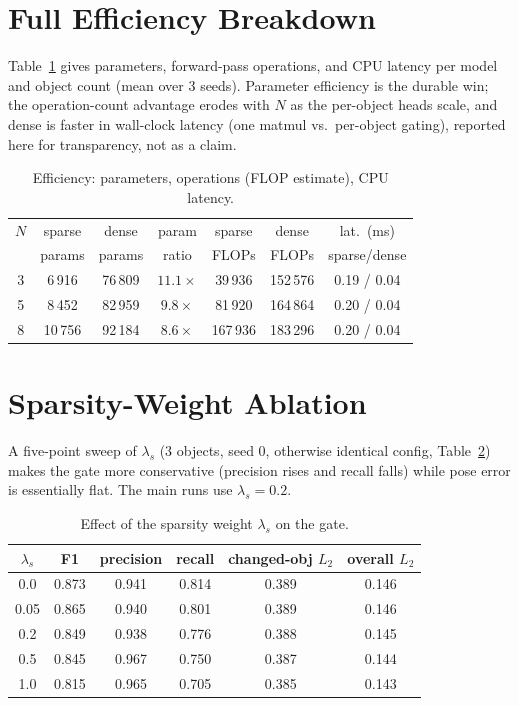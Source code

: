 \documentclass[conference]{IEEEtran}
\begin{document}
\section{Full Efficiency Breakdown}\label{app:eff}
Table~\ref{tab:eff} gives parameters, forward-pass operations, and CPU latency per
model and object count (mean over 3 seeds). Parameter efficiency is the durable win;
the operation-count advantage erodes with $N$ as the per-object heads scale, and dense
is faster in wall-clock latency (one matmul vs.\ per-object gating), reported here for
transparency, not as a claim.

\begin{table}[h]
\caption{Efficiency: parameters, operations (FLOP estimate), CPU latency.}
\label{tab:eff}
\centering \footnotesize \setlength{\tabcolsep}{3.5pt}
\begin{tabular}{@{}ccccccc@{}}
\toprule
$N$ & sparse & dense & param & sparse & dense & lat.\ (ms) \\
    & params & params & ratio & FLOPs & FLOPs & sparse/dense \\
\midrule
3 & 6\,916 & 76\,809 & $11.1\times$ & 39\,936 & 152\,576 & 0.19 / 0.04 \\
5 & 8\,452 & 82\,959 & $9.8\times$ & 81\,920 & 164\,864 & 0.20 / 0.04 \\
8 & 10\,756 & 92\,184 & $8.6\times$ & 167\,936 & 183\,296 & 0.20 / 0.04 \\
\bottomrule
\end{tabular}
\end{table}

\section{Sparsity-Weight Ablation}\label{app:ablation}
A five-point sweep of $\lambda_s$ (3 objects, seed 0, otherwise identical config,
Table~\ref{tab:ablation}) makes the gate more conservative (precision rises and recall
falls) while pose error is essentially flat. The main runs use $\lambda_s{=}0.2$.

\begin{table}[h]
\caption{Effect of the sparsity weight $\lambda_s$ on the gate.}
\label{tab:ablation}
\centering \footnotesize \setlength{\tabcolsep}{4pt}
\begin{tabular}{@{}cccccc@{}}
\toprule
$\lambda_s$ & F1 & precision & recall & changed-obj $L_2$ & overall $L_2$ \\
\midrule
0.0  & 0.873 & 0.941 & 0.814 & 0.389 & 0.146 \\
0.05 & 0.865 & 0.940 & 0.801 & 0.389 & 0.146 \\
0.2  & 0.849 & 0.938 & 0.776 & 0.388 & 0.145 \\
0.5  & 0.845 & 0.967 & 0.750 & 0.387 & 0.144 \\
1.0  & 0.815 & 0.965 & 0.705 & 0.385 & 0.143 \\
\bottomrule
\end{tabular}
\end{table}
\end{document}
